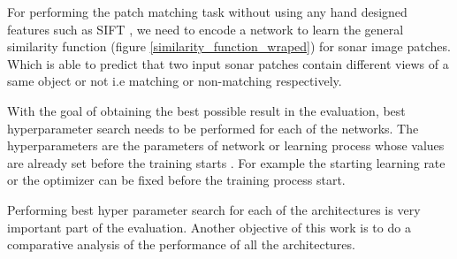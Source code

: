 For performing the patch matching task without using any hand designed features such as SIFT \cite{lowe2004distinctive}, we need to encode a network to learn the general
similarity function (figure \ref{similarity_function_wraped})
for sonar image patches. Which is able to predict that two input sonar patches contain different views of a same object or not i.e matching or non-matching respectively.

With the goal of obtaining the best possible result in the evaluation, best hyperparameter search needs to be 
performed for each of the networks. The hyperparameters are the parameters of network or learning process whose values are already set before the training starts \cite{wikihyper}. For example the starting learning rate 
or the optimizer can be fixed before the training process start. 

Performing best hyper parameter search for each of the architectures is very important part of the evaluation. Another objective of this work is to do a comparative analysis of the performance of all the architectures.








